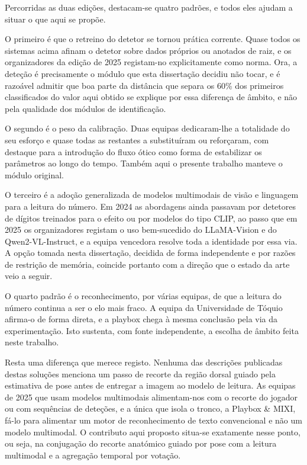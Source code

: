 Percorridas as duas edições, destacam-se quatro padrões, e todos eles ajudam a situar o
que aqui se propõe.

O primeiro é que o retreino do detetor se tornou prática corrente. Quase todos os sistemas
acima afinam o detetor sobre dados próprios ou anotados de raiz, e os organizadores da
edição de 2025 registam-no explicitamente como norma. Ora, a deteção é precisamente o
módulo que esta dissertação decidiu não tocar, e é razoável admitir que boa parte da
distância que separa os 60\% dos primeiros classificados do valor aqui obtido se explique
por essa diferença de âmbito, e não pela qualidade dos módulos de identificação.

O segundo é o peso da calibração. Duas equipas dedicaram-lhe a totalidade do seu esforço e
quase todas as restantes a substituíram ou reforçaram, com destaque para a introdução do
fluxo ótico como forma de estabilizar os parâmetros ao longo do tempo. Também aqui o
presente trabalho manteve o módulo original.

O terceiro é a adoção generalizada de modelos multimodais de visão e linguagem para a
leitura do número. Em 2024 as abordagens ainda passavam por detetores de dígitos treinados
para o efeito ou por modelos do tipo CLIP, ao passo que em 2025 os organizadores registam o
uso bem-sucedido do LLaMA-Vision e do Qwen2-VL-Instruct, e a equipa vencedora resolve toda a
identidade por essa via. A opção tomada nesta dissertação, decidida de forma independente e
por razões de restrição de memória, coincide portanto com a direção que o estado da arte
veio a seguir.

O quarto padrão é o reconhecimento, por várias equipas, de que a leitura do número continua
a ser o elo mais fraco. A equipa da Universidade de Tóquio afirma-o de forma direta, e a
playbox chega à mesma conclusão pela via da experimentação. Isto sustenta, com fonte
independente, a escolha de âmbito feita neste trabalho.

Resta uma diferença que merece registo. Nenhuma das descrições publicadas destas soluções
menciona um passo de recorte da região dorsal guiado pela estimativa de pose antes de
entregar a imagem ao modelo de leitura. As equipas de 2025 que usam modelos multimodais
alimentam-nos com o recorte do jogador ou com sequências de deteções, e a única que isola
o tronco, a Playbox \& MIXI, fá-lo para alimentar um motor de reconhecimento de texto
convencional e não um modelo multimodal. O contributo aqui proposto situa-se exatamente
nesse ponto, ou seja, na conjugação do recorte anatómico guiado por pose com a leitura
multimodal e a agregação temporal por votação.
